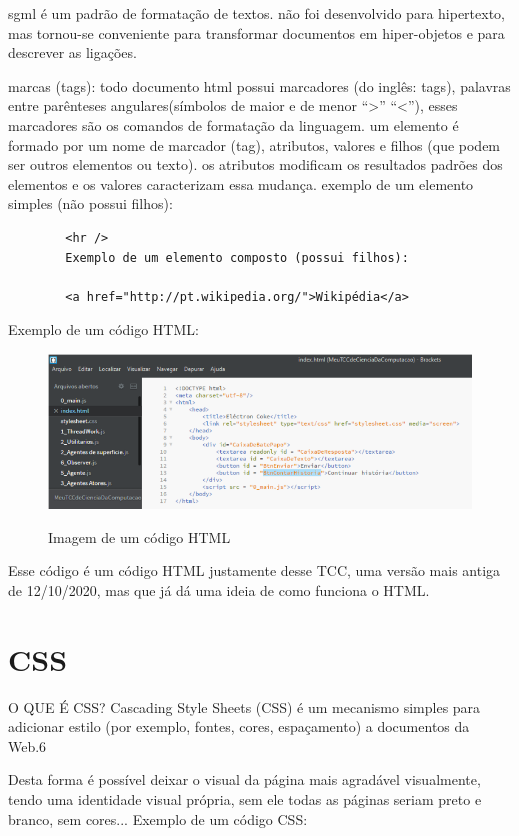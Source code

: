 	sgml é um padrão de formatação de textos. não foi desenvolvido para hipertexto, mas tornou-se  conveniente para transformar documentos em hiper-objetos e para descrever as ligações. 	
	
	marcas (tags): todo documento html possui marcadores (do inglês: tags), palavras entre parênteses angulares(símbolos de maior e de menor “>” “<”), esses marcadores são os comandos de formatação da linguagem. um elemento é formado por um nome de marcador (tag), atributos, valores e filhos (que podem ser outros elementos ou texto). os atributos modificam os resultados padrões dos elementos e os valores caracterizam essa mudança. exemplo de um elemento simples (não possui filhos): 
	
	\begin{verbatim}	
		<hr /> 
		Exemplo de um elemento composto (possui filhos): 
		
		<a href="http://pt.wikipedia.org/">Wikipédia</a> 	
	\end{verbatim}
	Exemplo de um código HTML:		
	\begin{figure}[H]
		\centering
		\caption{Imagem de um código HTML}
		\centering
		\includegraphics[scale=0.75]{./images/Figure_5}	
		\label{fig:Fig5} 
	\end{figure}	
	Esse código é um código HTML justamente desse TCC, uma versão mais antiga de 12/10/2020, mas que já dá uma ideia de como funciona o HTML.
	
\section{CSS}
\label{sec:CSS}

O QUE É CSS? Cascading Style Sheets (CSS) é um mecanismo simples para adicionar estilo (por exemplo, fontes, cores, espaçamento) a documentos da Web.6 

Desta forma é possível deixar o visual da página mais agradável visualmente, tendo uma identidade visual própria, sem ele todas as páginas seriam preto e branco, sem cores... 
Exemplo de um código CSS: 

